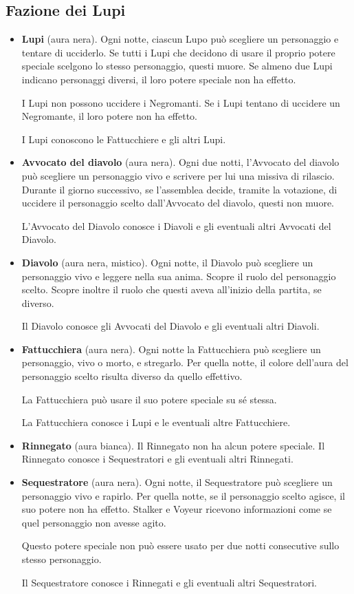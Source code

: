\documentclass[a4paper,10pt]{article}
\begin{document}
\subsection*{Fazione dei Lupi}

\begin{itemize}
 \item {\bf Lupi} (aura nera). Ogni notte, ciascun Lupo può scegliere un personaggio e tentare di ucciderlo.
 Se tutti i Lupi che decidono di usare il proprio potere speciale scelgono lo stesso personaggio, questi muore.
 Se almeno due Lupi indicano personaggi diversi, il loro potere speciale non ha effetto.
 
 I Lupi non possono uccidere i Negromanti. Se i Lupi tentano di uccidere un Negromante, il loro potere non ha effetto.
 
 I Lupi conoscono le Fattucchiere e gli altri Lupi.

 \item {\bf Avvocato del diavolo} (aura nera). Ogni due notti, l'Avvocato del diavolo può scegliere un personaggio vivo e scrivere per lui una missiva di rilascio.
 Durante il giorno successivo, se l'assemblea decide, tramite la votazione, di uccidere il personaggio scelto dall'Avvocato del diavolo, questi non muore.
 
 L'Avvocato del Diavolo conosce i Diavoli e gli eventuali altri Avvocati del Diavolo.

 \item {\bf Diavolo} (aura nera, mistico). Ogni notte, il Diavolo può scegliere un personaggio vivo e leggere nella sua anima. Scopre il ruolo del personaggio scelto. Scopre inoltre il ruolo che questi aveva all'inizio della partita, se diverso.
 
 Il Diavolo conosce gli Avvocati del Diavolo e gli eventuali altri Diavoli.
 
 \item {\bf Fattucchiera} (aura nera). Ogni notte la Fattucchiera può scegliere un personaggio, vivo o morto, e stregarlo. Per quella notte, il colore dell'aura del personaggio scelto risulta diverso da quello effettivo.
 
 La Fattucchiera può usare il suo potere speciale su sé stessa.
 
 La Fattucchiera conosce i Lupi e le eventuali altre Fattucchiere.
 
 \item {\bf Rinnegato} (aura bianca). Il Rinnegato non ha alcun potere speciale. Il Rinnegato conosce i Sequestratori e gli eventuali altri Rinnegati.

 \item {\bf Sequestratore} (aura nera). Ogni notte, il Sequestratore può scegliere un personaggio vivo e rapirlo. Per quella notte, se il personaggio scelto agisce, il suo potere non ha effetto.
 Stalker e Voyeur ricevono informazioni come se quel personaggio non avesse agito.
 
 Questo potere speciale non può essere usato per due notti consecutive sullo stesso personaggio.
 
 Il Sequestratore conosce i Rinnegati e gli eventuali altri Sequestratori.


\end{itemize}
\end{document}

